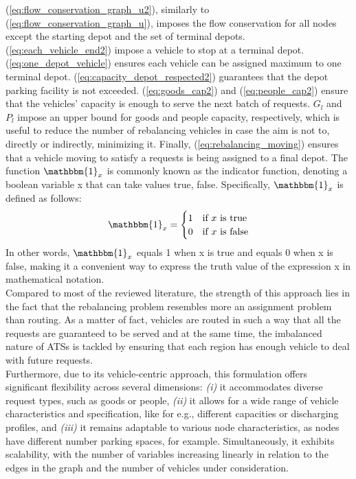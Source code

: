 (\ref{eq:flow_conservation_graph_u2}), similarly to (\ref{eq:flow_conservation_graph_u}), imposes the flow conservation for all nodes except the starting depot and the set of terminal depots. (\ref{eq:each_vehicle_end2}) impose a vehicle to stop at a terminal depot. (\ref{eq:one_depot_vehicle}) ensures each vehicle can be assigned maximum to one terminal depot. (\ref{eq:capacity_depot_respected2}) guarantees that the depot parking facility is not exceeded. (\ref{eq:goods_cap2}) and (\ref{eq:people_cap2}) ensure that the vehicles' capacity is enough to serve the next batch of requests. $G_{l}$ and $P_l$ impose an upper bound for goods and people capacity, respectively, which is useful to reduce the number of rebalancing vehicles in case the aim is not to, directly or indirectly, minimizing it. Finally, (\ref{eq:rebalancing_moving}) ensures that a vehicle moving to satisfy a requests is being assigned to a final depot. The function $\mathbbm{1}_x$ is commonly known as the indicator function, denoting a boolean variable x that can take values {true, false}. Specifically, $\mathbbm{1}_x$ is defined as follows:
\begin{equation}
	\mathbbm{1}_x = \begin{cases}
		1 & \text{if } x \text{ is true} \\
		0 & \text{if } x \text{ is false}
	\end{cases}
\end{equation}
In other words, $\mathbbm{1}_x$ equals 1 when x is true and equals 0 when x is false, making it a convenient way to express the truth value of the expression x in mathematical notation.\\
Compared to most of the reviewed literature, the strength of this approach lies in the fact that the rebalancing problem resembles more an assignment problem than routing. As a matter of fact, vehicles are routed in such a way that all the requests are guaranteed to be served and at the same time, the imbalanced nature of ATSs is tackled by ensuring that each region has enough vehicle to deal with future requests. \\
Furthermore, due to its vehicle-centric approach, this formulation offers significant flexibility across several dimensions: \textit{(i)} it accommodates diverse request types, such as goods or people, \textit{(ii)} it allows for a wide range of vehicle characteristics and specification, like for e.g., different capacities or discharging profiles, and \textit{(iii)} it remains adaptable to various node characteristics, as nodes have different number parking spaces, for example. Simultaneously, it exhibits scalability, with the number of variables increasing linearly in relation to the edges in the graph and the number of vehicles under consideration.\\
